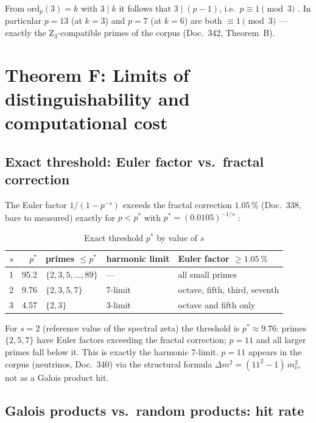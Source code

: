 From $\mathrm{ord}_p(3) = k$ with $3 \mid k$ it follows that $3 \mid (p-1)$,
i.e.\ $p \equiv 1 \pmod{3}$ \BM. In particular $p = 13$ (at $k=3$) and
$p = 7$ (at $k=6$) are both $\equiv 1 \pmod{3}$ — exactly the
Z$_3$-compatible primes of the corpus (Doc.~342, Theorem~B).

\section{Theorem F: Limits of distinguishability and computational cost}

\subsection{Exact threshold: Euler factor vs.\ fractal correction}

The Euler factor $1/(1-p^{-s})$ exceeds the fractal correction $1.05\,\%$
(Doc.~338, bare to measured) exactly for $p < p^*$ with
$p^* = (0.0105)^{-1/s}$ \BM:

\begin{table}[H]
\centering
\caption{Exact threshold $p^*$ by value of $s$}
\begin{tabular}{rrlll}
\toprule
$s$ & $p^*$ & primes $\leq p^*$ & harmonic limit & Euler factor $\geq 1.05\,\%$ \\
\midrule
1 & 95.2 & $\{2,3,5,\ldots,89\}$ & --- & all small primes \\
2 & 9.76 & $\{2, 3, 5, 7\}$ & 7-limit & octave, fifth, third, seventh \\
3 & 4.57 & $\{2, 3\}$ & 3-limit & octave and fifth only \\
\bottomrule
\end{tabular}
\end{table}

For $s = 2$ (reference value of the spectral zeta) the threshold is
$p^* \approx 9.76$: primes $\{2, 5, 7\}$ have Euler factors exceeding the
fractal correction; $p = 11$ and all larger primes fall below it. This is
exactly the harmonic 7-limit. $p = 11$ appears in the corpus (neutrinos,
Doc.~340) via the structural formula $\Delta m^2 = (11^2-1)\,m_\nu^2$,
not as a Galois product hit.

\subsection{Galois products vs.\ random products: hit rate}

